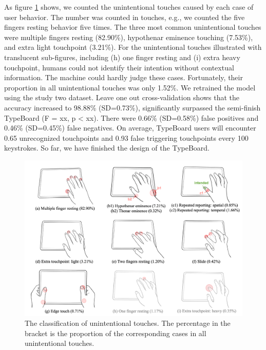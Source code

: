 As figure \ref{fig:unintentional_touch} shows, we counted the unintentional touches caused by each case of user behavior. The number was counted in touches, e.g., we counted the five fingers resting behavior five times. The three most common unintentional touches were multiple fingers resting (82.90\%), hypothenar eminence touching (7.53\%), and extra light touchpoint (3.21\%). For the unintentional touches illustrated with translucent sub-figures, including (h) one finger resting and (i) extra heavy touchpoint, humans could not identify their intention without contextual information. The machine could hardly judge these cases. Fortunately, their proportion in all unintentional touches was only 1.52\%.
We retrained the model using the study two dataset. Leave one out cross-validation shows that the accuracy increased to 98.88\% (SD=0.73\%), significantly surpassed the semi-finish TypeBoard (F = xx, p < xx). There were 0.66\% (SD=0.58\%) false positives and 0.46\% (SD=0.45\%) false negatives. On average, TypeBoard users will encounter 0.65 unrecognized touchpoints and 0.93 false triggering touchpoints every 100 keystrokes. So far, we have finished the design of the TypeBoard.

\begin{figure}[!tbh]
	\includegraphics[width=1.0\linewidth]{figures/unintentional_touch.png}
	\centering
	\caption{The classification of unintentional touches. The percentage in the bracket is the proportion of the corresponding cases in all unintentional touches.}
	\label{fig:unintentional_touch}
\end{figure}


